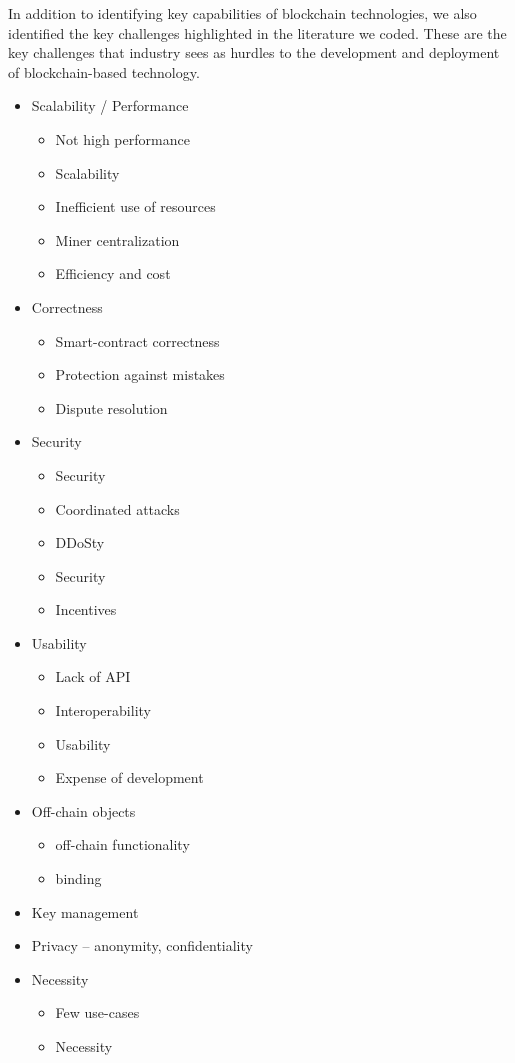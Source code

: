
In addition to identifying key capabilities of blockchain technologies, we also identified the key challenges highlighted in the literature we coded.  These are the key challenges that industry sees as hurdles to the development and deployment of blockchain-based technology.  

\begin{itemize}
\item Scalability / Performance
\begin{itemize}
\item Not high performance
\item Scalability
\item Inefficient use of resources
\item Miner centralization
\item Efficiency and cost
\end{itemize}
\item Correctness
\begin{itemize}
\item Smart-contract correctness
\item Protection against mistakes
\item Dispute resolution
\end{itemize}
\item Security
\begin{itemize}
\item Security
\item Coordinated attacks
\item DDoSty
\item Security
\item Incentives
\end{itemize}
\item Usability
\begin{itemize}
\item Lack of API
\item Interoperability
\item Usability
\item Expense of development
\end{itemize}
\item Off-chain objects
\begin{itemize}
\item off-chain functionality
\item binding
\end{itemize}
\item Key management
\item Privacy -- anonymity, confidentiality
\item Necessity
\begin{itemize}
\item Few use-cases
\item Necessity
\end{itemize}
\end{itemize}

